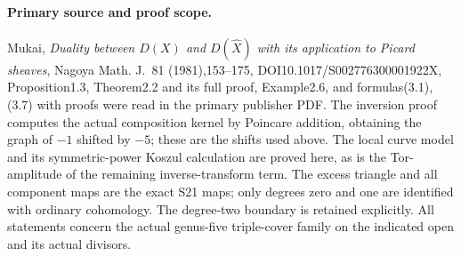 \paragraph{Primary source and proof scope.}
Mukai, \emph{Duality between $D(X)$ and $D(\widehat X)$
with its application to Picard sheaves}, Nagoya Math.
J.~81 (1981),153--175, DOI10.1017/S002776300001922X,
Proposition1.3, Theorem2.2 and its full proof, Example2.6,
and formulas(3.1),(3.7) with proofs were read in the
primary publisher PDF. The inversion proof computes the
actual composition kernel by Poincare addition, obtaining
the graph of $-1$ shifted by $-5$; these are the shifts
used above. The local curve model and its symmetric-power
Koszul calculation are proved here, as is the Tor-amplitude
of the remaining inverse-transform term. The excess
triangle and all component maps are the exact S21 maps;
only degrees zero and one are identified with ordinary
cohomology. The degree-two boundary is retained explicitly.
All statements concern the actual genus-five triple-cover
family on the indicated open and its actual divisors.
